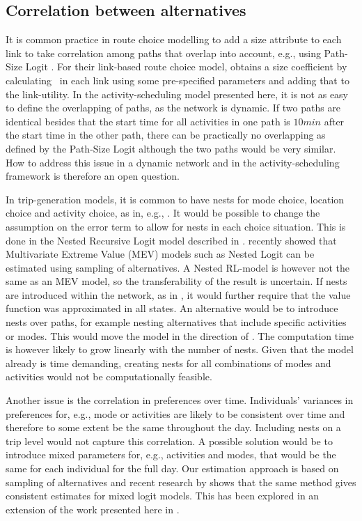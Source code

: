 \subsection{Correlation between alternatives}
It is common practice in route choice modelling to add a size attribute to each link to take correlation among paths that overlap into account, e.g., using Path-Size Logit \citep{BenAkivaBier99}. For their link-based route choice model, \citet{fosgerau2013} obtains a size coefficient by calculating \eutil\, in each link using some pre-specified parameters and adding that to the link-utility. In the activity-scheduling model presented here, it is not as easy to define the overlapping of paths, as the network is dynamic. If two paths are identical besides that the start time for all activities in one path is $10\unit{min}$ after the start time in the other path, there can be practically no overlapping as defined by the Path-Size Logit although the two paths would be very similar. How to address this issue in a dynamic network and in the activity-scheduling framework is therefore an open question.

In trip-generation models, it is common to have nests for mode choice, location choice and activity choice, as in, e.g., \citet{bowman2001}. It would be possible to change the assumption on the error term to allow for nests in each choice situation. This is done in the Nested Recursive Logit model described in \citet{mai2015}.
\citet{guevara2013MEV} recently showed that Multivariate Extreme Value (MEV) models such as Nested Logit can be estimated using sampling of alternatives. A Nested RL-model is however not the same as an MEV model, so the transferability of the result is uncertain. If nests are introduced within the network, as in \citet{mai2015}, it would further require that the value function was approximated in all states. An alternative would be to introduce nests over paths, for example nesting alternatives that include specific activities or modes. This would move the model in the direction of \citet{bowman2001}. The computation time is however likely to grow linearly with the number of nests. Given that the model already is time demanding, creating nests for all combinations of modes and activities would not be computationally feasible.

 Another issue is the correlation in preferences over time. Individuals' variances in preferences for, e.g., mode or activities are likely to be consistent over time and therefore to some extent be the same throughout the day. Including nests on a trip level would not capture this correlation. A possible solution would be to introduce mixed parameters for, e.g., activities and modes, that would be the same for each individual for the full day. Our estimation approach is based on sampling of alternatives and recent research by \citet{guevara2013mixed} shows that the same method gives consistent estimates for mixed logit models. This has been explored in an extension of the work presented here in \citep{maelleMixed17}.

